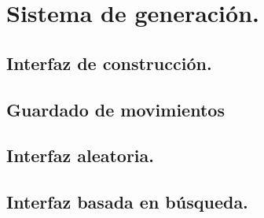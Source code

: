 \chapter{Sistema de generación.}\label{cap:capitulo5}



\section{Interfaz de construcción.}


\section{Guardado de movimientos}

\section{Interfaz aleatoria.}


\section{Interfaz basada en búsqueda.}

